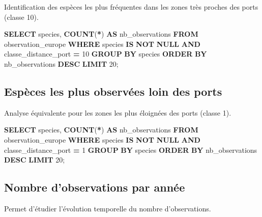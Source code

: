 \documentclass[mstat,12pt]{unswthesis}
\newenvironment{Shaded}{\begin{snugshade}}{\end{snugshade}}
\newcommand{\DecValTok}[1]{\textcolor[rgb]{0.00,0.00,0.81}{#1}}
\newcommand{\FunctionTok}[1]{\textcolor[rgb]{0.13,0.29,0.53}{\textbf{#1}}}
\newcommand{\KeywordTok}[1]{\textcolor[rgb]{0.13,0.29,0.53}{\textbf{#1}}}
\newcommand{\NormalTok}[1]{#1}
\newcommand{\OperatorTok}[1]{\textcolor[rgb]{0.81,0.36,0.00}{\textbf{#1}}}
\begin{document}
Identification des espèces les plus fréquentes dans les zones très
proches des ports (classe 10).

\begin{Shaded}
\begin{Highlighting}[]
\KeywordTok{SELECT}\NormalTok{ species, }\FunctionTok{COUNT}\NormalTok{(}\OperatorTok{*}\NormalTok{) }\KeywordTok{AS}\NormalTok{ nb\_observations}
\KeywordTok{FROM}\NormalTok{ observation\_europe}
\KeywordTok{WHERE}\NormalTok{ species }\KeywordTok{IS} \KeywordTok{NOT} \KeywordTok{NULL}
  \KeywordTok{AND}\NormalTok{ classe\_distance\_port }\OperatorTok{=} \DecValTok{10}
\KeywordTok{GROUP} \KeywordTok{BY}\NormalTok{ species}
\KeywordTok{ORDER} \KeywordTok{BY}\NormalTok{ nb\_observations }\KeywordTok{DESC}
\KeywordTok{LIMIT} \DecValTok{20}\NormalTok{;}
\end{Highlighting}
\end{Shaded}

\subsection{Espèces les plus observées loin des
ports}\label{espuxe8ces-les-plus-observuxe9es-loin-des-ports}

Analyse équivalente pour les zones les plus éloignées des ports (classe
1).

\begin{Shaded}
\begin{Highlighting}[]
\KeywordTok{SELECT}\NormalTok{ species, }\FunctionTok{COUNT}\NormalTok{(}\OperatorTok{*}\NormalTok{) }\KeywordTok{AS}\NormalTok{ nb\_observations}
\KeywordTok{FROM}\NormalTok{ observation\_europe}
\KeywordTok{WHERE}\NormalTok{ species }\KeywordTok{IS} \KeywordTok{NOT} \KeywordTok{NULL}
  \KeywordTok{AND}\NormalTok{ classe\_distance\_port }\OperatorTok{=} \DecValTok{1}
\KeywordTok{GROUP} \KeywordTok{BY}\NormalTok{ species}
\KeywordTok{ORDER} \KeywordTok{BY}\NormalTok{ nb\_observations }\KeywordTok{DESC}
\KeywordTok{LIMIT} \DecValTok{20}\NormalTok{;}
\end{Highlighting}
\end{Shaded}

\subsection{Nombre d'observations par
année}\label{nombre-dobservations-par-annuxe9e}

Permet d'étudier l'évolution temporelle du nombre d'observations.
\end{document}

